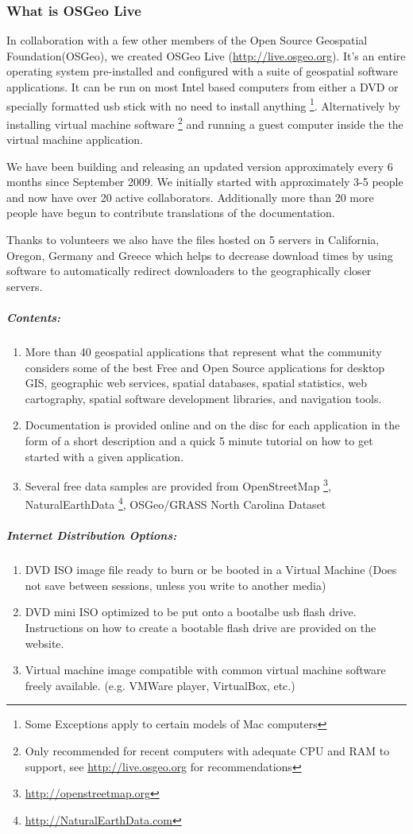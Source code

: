 \documentclass[12pt,letterpaper]{article}
\begin{document}
\subsubsection{What is OSGeo Live}
In collaboration with a few other members of the Open Source Geospatial Foundation(OSGeo), we created OSGeo Live (\url{http://live.osgeo.org}). It's an entire operating system pre-installed and configured with a suite of geospatial software applications. It can be run on most Intel based computers from either a DVD or specially formatted usb stick with no need to install anything \footnote{Some Exceptions apply to certain models of Mac computers}. Alternatively by installing virtual machine software \footnote{Only recommended for recent computers with adequate CPU and RAM to support, see \url{http://live.osgeo.org} for recommendations} and running a guest computer inside the the virtual machine application.

We have been building and releasing an updated version approximately every 6 months since September 2009. We initially started with approximately 3-5 people and now have over 20 active collaborators. Additionally more than 20 more people have begun to contribute translations of the documentation.  

Thanks to volunteers we also have the files hosted on 5 servers in California, Oregon, Germany and Greece which helps to decrease download times by using software to automatically redirect downloaders to the geographically closer servers.

\subparagraph{Contents:}
\begin{enumerate}
\item More than 40 geospatial applications that represent what the community considers some of the best Free and Open Source applications for desktop GIS, geographic web services, spatial databases, spatial statistics, web cartography, spatial software development libraries, and navigation tools.
\item Documentation is provided online and on the disc for each application in the form of a short description and a quick 5 minute tutorial on how to get started with a given application.
\item Several free data samples are provided from OpenStreetMap \footnote{\url{http://openstreetmap.org}}, NaturalEarthData \footnote{\url{http://NaturalEarthData.com}}, OSGeo/GRASS North Carolina Dataset
\end{enumerate}

\subparagraph{Internet Distribution Options:}
\begin{enumerate}
\item DVD ISO image file ready to burn or be booted in a Virtual Machine (Does not save between sessions, unless you write to another media)
\item DVD mini ISO optimized to be put onto a bootalbe usb flash drive. Instructions on how to create a bootable flash drive are provided on the website.
\item Virtual machine image compatible with common virtual machine software freely available. (e.g. VMWare player, VirtualBox, etc.)
\end{enumerate}
\end{document}
